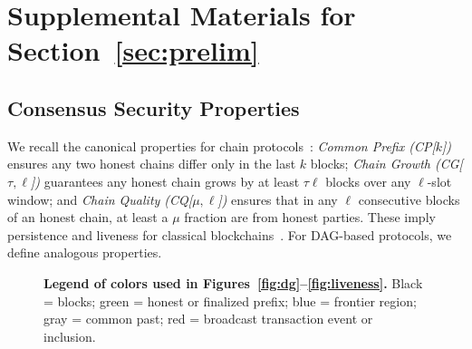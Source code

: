 

\section{Supplemental Materials for Section~\ref{sec:prelim}} 
\label{app:prelim}

\subsection{Consensus Security Properties}
\label{app:DG-DQ-DCP}

We recall the canonical properties for chain protocols~\cite{EC:GarKiaLeo15}: {\em Common Prefix (CP[$k$])} ensures any two honest chains differ only in the last $k$ blocks; {\em Chain Growth (CG[$\tau,\ell$])} guarantees any honest chain grows by at least $\tau\ell$ blocks over any $\ell$-slot window; and {\em Chain Quality (CQ[$\mu,\ell$])} ensures that in any $\ell$ consecutive blocks of an honest chain, at least a $\mu$ fraction are from honest parties. These imply persistence and liveness for classical blockchains~\cite{EC:GarKiaLeo15}.
For DAG-based protocols, we define analogous properties. 


\begin{figure}[htbp!]
\centering
{}
\caption{\textbf{Legend of colors used in Figures~\ref{fig:dg}--\ref{fig:liveness}.} 
Black = blocks; green = honest or finalized prefix; 
blue = frontier region; gray = common past; red = broadcast transaction event or inclusion.}
\label{fig:legend}
\end{figure}




